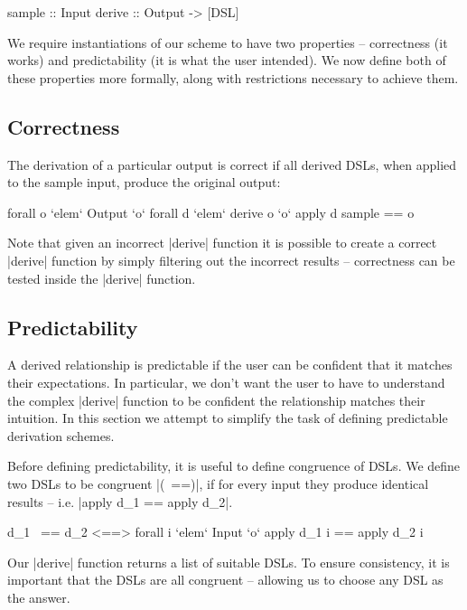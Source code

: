 \documentclass{llncs}
\begin{document}
\begin{code}
sample  :: Input
derive  :: Output -> [DSL]
\end{code}

We require instantiations of our scheme to have two properties -- correctness (it works) and predictability (it is what the user intended). We now define both of these properties more formally, along with restrictions necessary to achieve them.

\subsection{Correctness}
\label{sec:correctness}

The derivation of a particular output is correct if all derived DSLs, when applied to the sample input, produce the original output:

\ignore\begin{code}
forall o `elem` Output `o` forall d `elem` derive o `o` apply d sample == o
\end{code}

Note that given an incorrect |derive| function it is possible to create a correct |derive| function by simply filtering out the incorrect results -- correctness can be tested inside the |derive| function.

\subsection{Predictability}
\label{sec:pred}

A derived relationship is predictable if the user can be confident that it matches their expectations. In particular, we don't want the user to have to understand the complex |derive| function to be confident the relationship matches their intuition. In this section we attempt to simplify the task of defining predictable derivation schemes.

Before defining predictability, it is useful to define congruence of DSLs. We define two DSLs to be congruent |(~==)|, if for every input they produce identical results -- i.e. |apply d_1 == apply d_2|.

\ignore\begin{code}
d_1 ~== d_2 <==> forall i `elem` Input `o` apply d_1 i == apply d_2 i
\end{code}

Our |derive| function returns a list of suitable DSLs. To ensure consistency, it is important that the DSLs are all congruent -- allowing us to choose any DSL as the answer.
\end{document}
